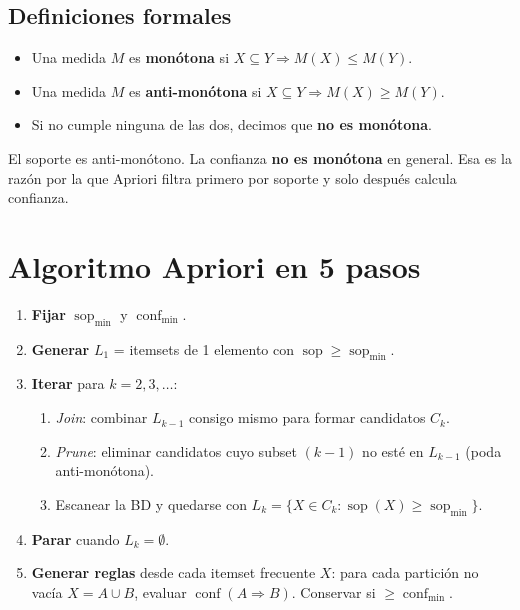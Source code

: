 \documentclass[11pt,a4paper]{article}
\newcommand{\conf}{\operatorname{conf}}
\newcommand{\sop}{\operatorname{sop}}
\begin{document}
\subsection{Definiciones formales}

\begin{itemize}
    \item Una medida $M$ es \textbf{monótona} si $X \subseteq Y \Rightarrow M(X) \le M(Y)$.
    \item Una medida $M$ es \textbf{anti-monótona} si $X \subseteq Y \Rightarrow M(X) \ge M(Y)$.
    \item Si no cumple ninguna de las dos, decimos que \textbf{no es monótona}.
\end{itemize}

El soporte es anti-monótono. La confianza \textbf{no es monótona} en general. Esa es la
razón por la que Apriori filtra primero por soporte y solo después calcula confianza.

\section{Algoritmo Apriori en 5 pasos}

\begin{pasobox}
\begin{enumerate}
    \item \textbf{Fijar} $\sop_{\min}$ y $\conf_{\min}$.
    \item \textbf{Generar} $L_1$ = itemsets de 1 elemento con $\sop \ge \sop_{\min}$.
    \item \textbf{Iterar} para $k = 2, 3, \ldots$:
    \begin{enumerate}
        \item \emph{Join}: combinar $L_{k-1}$ consigo mismo para formar candidatos $C_k$.
        \item \emph{Prune}: eliminar candidatos cuyo subset $(k-1)$ no esté en $L_{k-1}$ (poda anti-monótona).
        \item Escanear la BD y quedarse con $L_k = \{ X \in C_k : \sop(X) \ge \sop_{\min} \}$.
    \end{enumerate}
    \item \textbf{Parar} cuando $L_k = \emptyset$.
    \item \textbf{Generar reglas} desde cada itemset frecuente $X$: para cada partición
          no vacía $X = A \cup B$, evaluar $\conf(A \Rightarrow B)$. Conservar si $\ge \conf_{\min}$.
\end{enumerate}
\end{pasobox}
\end{document}
